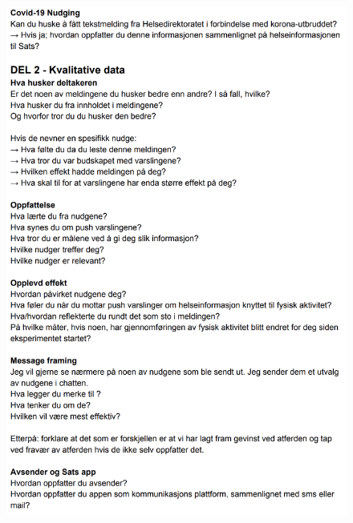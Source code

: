 \begin{figure}
    \centering
    \includegraphics[width=1\textwidth]{images/IG2.png}
\end{figure}

